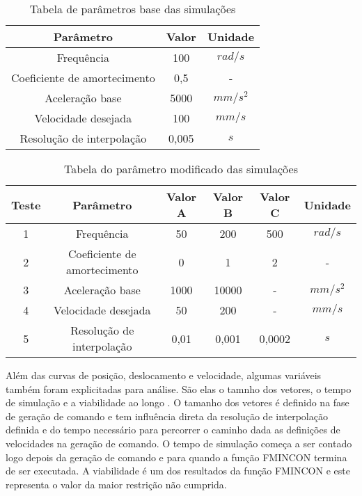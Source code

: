 \begin{table}
    \begin{center}
    \caption{Tabela de parâmetros base das simulações}
    \label{tab:base_params}
    \begin{tabular}{c c c}
        Parâmetro & Valor & Unidade\\ \hline
        Frequência & 100 & $rad/s$\\
        Coeficiente de amortecimento & 0,5 & - \\
        Aceleração base & 5000 & $mm/s^2$ \\
        Velocidade desejada & 100 & $mm/s$ \\
        Resolução de interpolação & 0,005 & $s$ \\ \hline
    \end{tabular}
    \end{center}
\end{table}

\begin{table}
    \begin{center}
    \caption{Tabela do parâmetro modificado das simulações}
    \label{tab:sim_params}
    \begin{tabular}{c c c c c c}
        Teste & Parâmetro & Valor A & Valor B & Valor C & Unidade\\ \hline
        1 & Frequência & 50 & 200 & 500 & $rad/s$\\
        2 & Coeficiente de amortecimento & 0 & 1 & 2 & - \\
        3 & Aceleração base & 1000 & 10000 & - & $mm/s^2$ \\
        4 & Velocidade desejada & 50 & 200 & - & $mm/s$ \\
        5 & Resolução de interpolação & 0,01 & 0,001 & 0,0002 & $s$ \\ \hline
    \end{tabular}
    \end{center}
\end{table}

Além das curvas de posição, deslocamento e velocidade, algumas variáveis também foram explicitadas para análise.
São elas o tamnho dos vetores, o tempo de simulação e a viabilidade ao longo .
O tamanho dos vetores é definido na fase de geração de comando e tem influência direta da resolução de interpolação definida e
do tempo necessário para percorrer o caminho dada as definições de velocidades na geração de comando.
O tempo de simulação começa a ser contado logo depois da geração de comando e para quando a função FMINCON
termina de ser executada.
A viabilidade é um dos resultados da função FMINCON e este representa o valor da maior restrição não cumprida.

